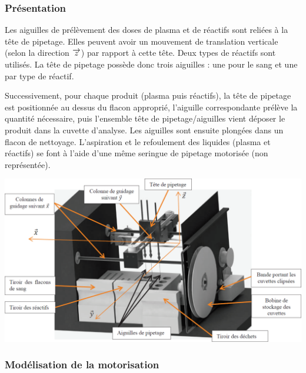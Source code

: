 \documentclass[10pt,fleqn]{article} %
\begin{document}
\subsubsection{Présentation}
Les aiguilles de prélèvement des doses de plasma et de réactifs sont reliées à la tête de pipetage.
Elles peuvent avoir un mouvement de translation verticale (selon la direction $\overrightarrow{z}$) par rapport à cette
tête. Deux types de réactifs sont utilisés. La tête de pipetage possède donc trois aiguilles : une pour
le sang et une par type de réactif.

Successivement, pour chaque produit (plasma puis réactifs), la tête de pipetage est positionnée au dessus
du flacon approprié, l’aiguille correspondante prélève la quantité nécessaire, puis l’ensemble
tête de pipetage/aiguilles vient déposer le produit dans la cuvette d’analyse. Les aiguilles sont
ensuite plongées dans un flacon de nettoyage. L’aspiration et le refoulement des liquides (plasma et
réactifs) se font à l’aide d’une même seringue de pipetage motorisée (non représentée).

\begin{center}
\includegraphics[width=\linewidth]{images/ccp_13}
\end{center}

\subsubsection{Modélisation de la motorisation}
\end{document}

